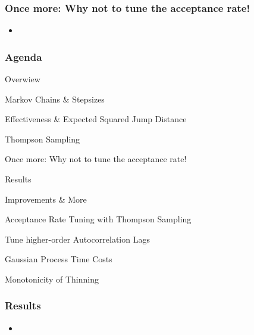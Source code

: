 \begin{frame}[c]
    \frametitle{Once more: Why not to tune the acceptance rate!}
    \begin{itemize}
        \item 
    \end{itemize}
\end{frame}

\begin{frame}[c]
    \frametitle{Agenda}
    \begin{itemize}
        {\color{lgray}
        \item Overwiew
        }
        \begin{itemize}
            {\color{lgray}
            \item Markov Chains \& Stepsizes
            \item Effectiveness \& Expected Squared Jump Distance 
            \item Thompson Sampling
            \item Once more: Why not to tune the acceptance rate!
            }
        \end{itemize}
        \item Results
        {\color{lgray}
        \item Improvements \& More
        }
        \begin{itemize}
            {\color{lgray}
            \item Acceptance Rate Tuning with Thompson Sampling
            \item Tune higher-order Autocorrelation Lags
            \item Gaussian Process Time Costs
            \item Monotonicity of Thinning
        }
        \end{itemize}
    \end{itemize}
\end{frame}

\begin{frame}[c]
    \frametitle{Results}
    \begin{itemize}
        \item 
    \end{itemize}
\end{frame}

